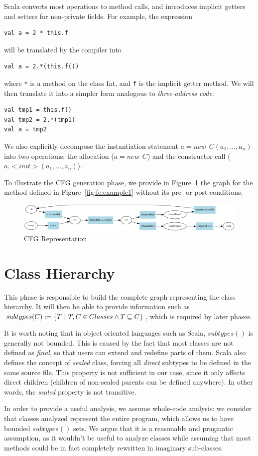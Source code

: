 Scala converts most operations to method calls, and introduces implicit getters
and setters for non-private fields. For example, the expression 
\begin{lstlisting}
val a = 2 * this.f
\end{lstlisting}
will be translated by the compiler into 
\begin{lstlisting}
val a = 2.*(this.f())
\end{lstlisting}
where \verb/*/ is a method on the class Int, and \verb/f/ is the implicit
getter method. We will then translate it into a simpler form analogous to
\emph{three-address code}:
\begin{lstlisting}
val tmp1 = this.f()
val tmp2 = 2.*(tmp1)
val a = tmp2
\end{lstlisting}

We also explicitly decompose the instantiation statement $a = new~~ C(a_1, ...,
a_n)$ into two operations: the allocation ($a = new~~ C$) and the constructor
call ($a.<init>(a_1, ..., a_n)$).

To illustrate the CFG generation phase, we provide in
Figure~\ref{fig:cfg:example1} the graph for the method defined in
Figure~\ref{fig:fe:example1} without its pre- or post-conditions.

\begin{figure}[h]
    \centering

    \includegraphics[scale=0.40]{images/cfg_example1}

    \caption{CFG Representation}
    \label{fig:cfg:example1}
\end{figure}

\section{Class Hierarchy}
This phase is responsible to build the complete graph representing the class
hierarchy. It will then be able to provide information such as $subtypes(C) :=
\{ T ~|~ T,C \in Classes \land T \sqsubseteq C \}$, which is required by later
phases.

It is worth noting that in object oriented languages such as Scala,
$subtypes()$ is generally not bounded. This is caused by the fact that most
classes are not defined as \emph{final}, so that users can extend and redefine
parts of them. Scala also defines the concept of \emph{sealed} class, forcing
all \emph{direct} subtypes to be defined in the same source file. This property
is not sufficient in our case, since it only affects direct children (children
of non-sealed parents can be defined anywhere). In other words, the
\emph{sealed} property is not transitive.

In order to provide a useful analysis, we assume whole-code analysis: we
consider that classes analyzed represent the entire program, which allows us to
have bounded $subtypes()$ sets.  We argue that it is a reasonable and pragmatic
assumption, as it wouldn't be useful to analyze classes while assuming that
most methods could be in fact completely rewritten in imaginary sub-classes.
